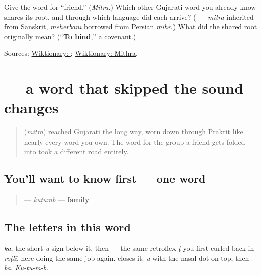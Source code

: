 \begin{tcolorbox}[breakable,colback=teal!4,colframe=teal!35!black,title={Before you move on}]
Give the word for \textquotedblleft{}friend.\textquotedblright{} (\emph{Mitra}.) Which other Gujarati word you already know shares its root, and through which language did each arrive? (\textbf{} — \emph{mitra} inherited from Sanskrit, \emph{meherbānī} borrowed from Persian \emph{mihr}.) What did the shared root originally mean? (\textquotedblleft{}\textbf{To bind},\textquotedblright{} a covenant.)

Sources: \href{https://en.wiktionary.org/wiki/\%E0\%AA\%AE\%E0\%AA\%BF\%E0\%AA\%A4\%E0\%AB\%8D\%E0\%AA\%B0}{Wiktionary: }; \href{https://en.wiktionary.org/wiki/Mithra}{Wiktionary: Mithra}.
\end{tcolorbox}
\section[kuṭumb]{ — a word that skipped the sound changes}

\label{lesson:GU-C11-kutumb}



\begin{quote}
\textbf{} (\emph{mitra}) reached Gujarati the long way, worn down through Prakrit like nearly every word you own. The word for the group a friend gets folded into took a different road entirely.
\end{quote}

\subsection*{You'll want to know first — one word}
\begin{quote}
\textbf{} — \emph{kuṭumb} — \textbf{family}
\end{quote}

\subsection*{The letters in this word}
\textbf{} \emph{ka}, \textbf{} the short-\emph{u} sign below it, then \textbf{} — the same retroflex \emph{ṭ} you first curled back in \emph{roṭlī}, here doing the same job again. \textbf{} closes it: \emph{u} with the nasal dot on top, then \textbf{} \emph{ba}. \emph{Ku-ṭu-m-b}.

